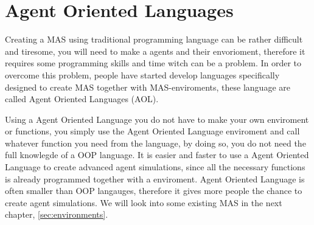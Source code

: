 \section{Agent Oriented Languages}
\indent Creating a MAS using traditional programming language can be rather difficult and tiresome, you will need to make a agents and their envorioment, therefore it requires some programming skills and time witch can be a problem. In order to overcome this problem, people have started develop languages specifically designed to create MAS together with MAS-enviroments, these language are called Agent Oriented Languages (AOL). 

\indent Using a Agent Oriented Language you do not have to make your own enviroment or functions, you simply use the Agent Oriented Language enviroment and call whatever function you need from the language, by doing so, you do not need the full knowlegde of a OOP language. It is easier and faster to use a Agent Oriented Language to create advanced agent simulations, since all the necessary functions is already programmed together with a enviroment. Agent Oriented Language is often smaller than OOP langauges, therefore it gives more people the chance to create agent simulations. We will look into some existing MAS in the next chapter, \ref{sec:environments}.
  